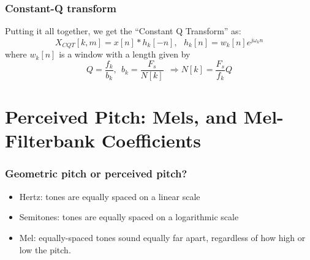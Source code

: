 \documentclass{beamer}
\begin{document}
\begin{frame}
  \frametitle{Constant-Q transform}

  Putting it all together, we get the ``Constant Q Transform'' as:
  \[
  X_{CQT}[k,m] = x[n]\ast h_k[-n],~~~h_k[n]=w_k[n]e^{j\omega_k n}
  \]
  where $w_k[n]$ is a window with a length given by
  \[
  Q = \frac{f_k}{b_k},~~b_k=\frac{F_s}{N[k]}~~\Rightarrow N[k]=\frac{F_s}{f_k}Q
  \]
\end{frame}

      
\section[Mel]{Perceived Pitch: Mels, and Mel-Filterbank Coefficients}
\setcounter{subsection}{1}

\begin{frame}
  \frametitle{Geometric pitch or perceived pitch?}

  \begin{itemize}
  \item Hertz: tones are equally spaced on a linear scale
  \item Semitones: tones are equally spaced on a logarithmic scale
  \item Mel: equally-spaced tones sound equally far apart, regardless of how high or
    low the pitch.
  \end{itemize}
\end{frame}
\end{document}
